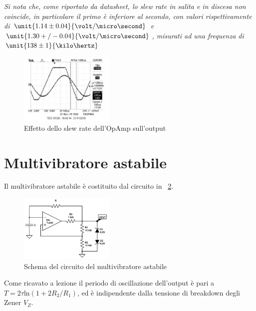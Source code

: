 \documentclass[10pt,a4paper]{article}
\begin{document}
\emph{Si nota che, come riportato da datasheet, lo slew rate in salita e in discesa non coincide, in particolare il primo è inferiore al secondo, con valori rispettivamente di $\unit{1.14 \pm 0.04}{\volt/\micro\second}$ e $\unit{1.30+/-0.04}{\volt/\micro\second}$, misurati ad una frequenza di $\unit{138 \pm 1}{\kilo\hertz}$}

\begin{figure}[H]
	\centering
	\includegraphics[width=0.40\textwidth]{../oscilloscopio/schmitt_slewrate.jpg}
	\caption{Effetto dello slew rate dell'OpAmp sull'output}
	\label{fig:slew_rate}
\end{figure}



\section{Multivibratore astabile}
Il multivibratore astabile è costituito dal circuito in \figurename{~\ref{fig:multivibratore}}.

\begin{figure}[H]
	\centering
	\includegraphics[width=0.40\textwidth]{../circuiti/multivibratore.jpg}
	\caption{Schema del circuito del multivibratore astabile}
	\label{fig:multivibratore}
\end{figure}

Come ricavato a lezione il periodo di oscillazione dell'output è pari a $T = 2 \tau \text{ln}(1 + 2 R_2/R_1)$, ed è indipendente dalla tensione di breakdown degli Zener $V_Z$.
\end{document}
